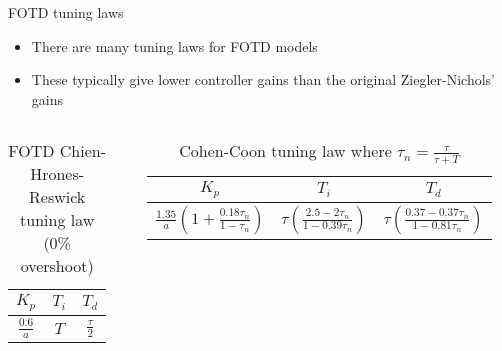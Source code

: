 \documentclass{beamer-control}
\begin{document}
\begin{frame}{FOTD tuning laws}
\begin{itemize}
	\item There are many tuning laws for FOTD models
	\item These typically give lower controller gains than the original Ziegler-Nichols' gains
\end{itemize}

\begin{columns}
\begin{column}{0.4\textwidth}
	\begin{table}
	\centering
	\begin{tabular}{|c|c|c|}
		\hline
		$K_p$ & $T_i$ & $T_d$\\
		\hline
		$\frac{0.6}{a}$ & $T$ & $\frac{\tau}{2}$\\
		\hline	
	\end{tabular}
	\caption{FOTD Chien-Hrones-Reswick tuning law (0\% overshoot)}
\end{table}
\end{column}

\begin{column}{0.6\textwidth}
			
\begin{table}
	\centering
	\begin{tabular}{|c|c|c|}
		\hline
		$K_p$ & $T_i$ & $T_d$\\
		\hline
		\tiny{$\frac{1.35}{a}\left(1 + \frac{0.18 \tau_n}{1-\tau_n} \right)$} & \tiny{$ \tau\left( \frac{2.5-2\tau_n}{1-0.39\tau_n} \right) $} & \tiny{$\tau \left( \frac{0.37-0.37\tau_n}{1-0.81\tau_n} \right)$}\\
		\hline	
	\end{tabular}
	\caption{Cohen-Coon tuning law where $\tau_n=\frac{\tau}{\tau+T}$}
\end{table}
\end{column}
\end{columns}


\end{frame}


\end{document}
